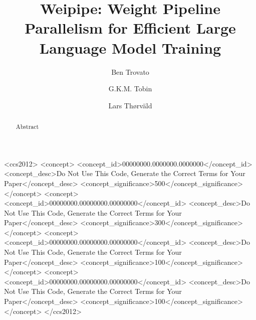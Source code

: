 \documentclass[sigplan,screen]{acmart}
\begin{document}
\title{Weipipe: Weight Pipeline Parallelism for Efficient Large Language Model Training}

\author{Ben Trovato}
\author{G.K.M. Tobin}
\authornotemark[1]

\author{Lars Th{\o}rv{\"a}ld}

\renewcommand{\shortauthors}{Trovato et al.}

\begin{abstract}
  Abstract
\end{abstract}


\begin{CCSXML}
<ccs2012>
 <concept>
  <concept_id>00000000.0000000.0000000</concept_id>
  <concept_desc>Do Not Use This Code, Generate the Correct Terms for Your Paper</concept_desc>
  <concept_significance>500</concept_significance>
 </concept>
 <concept>
  <concept_id>00000000.00000000.00000000</concept_id>
  <concept_desc>Do Not Use This Code, Generate the Correct Terms for Your Paper</concept_desc>
  <concept_significance>300</concept_significance>
 </concept>
 <concept>
  <concept_id>00000000.00000000.00000000</concept_id>
  <concept_desc>Do Not Use This Code, Generate the Correct Terms for Your Paper</concept_desc>
  <concept_significance>100</concept_significance>
 </concept>
 <concept>
  <concept_id>00000000.00000000.00000000</concept_id>
  <concept_desc>Do Not Use This Code, Generate the Correct Terms for Your Paper</concept_desc>
  <concept_significance>100</concept_significance>
 </concept>
</ccs2012>
\end{CCSXML}
\end{document}
